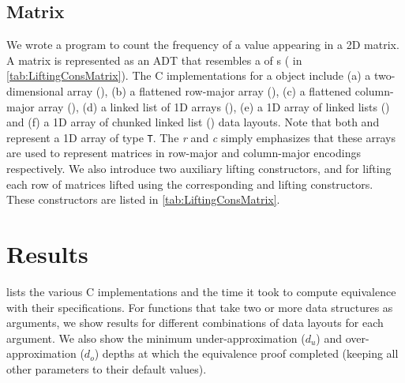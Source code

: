 

\subsection{Matrix}
\label{sec:expmat}
We wrote a \SpecL{} program to count the frequency of a value appearing in a 2D matrix.
A matrix is represented as an ADT that resembles a  of s ( in \cref{tab:LiftingConsMatrix}).
The C implementations for a  object include
(a) a two-dimensional array (), (b) a flattened row-major array (),
(c) a flattened column-major array (), (d) a linked list of 1D arrays (),
(e) a 1D array of linked lists () and (f) a 1D array of chunked linked list ()
data layouts. Note that both  and  represent a 1D array of type {\tt T}. The {\em r} and {\em c} simply
emphasizes that these arrays are used to represent matrices in row-major and column-major encodings respectively.
We also introduce two auxiliary lifting constructors,  and 
for lifting each row of matrices lifted using the corresponding  and   lifting
constructors. These constructors are listed in \cref{tab:LiftingConsMatrix}.



\section{Results}
\label{sec:results}
 lists the various C implementations and the time it took
to compute equivalence with their specifications. For functions that
take two or more data structures as arguments, we show
results for different combinations of data layouts for each argument.
We also show the minimum under-approximation ($d_u$) and over-approximation ($d_o$) depths
at which the equivalence proof completed (keeping all other parameters to their
default values).

